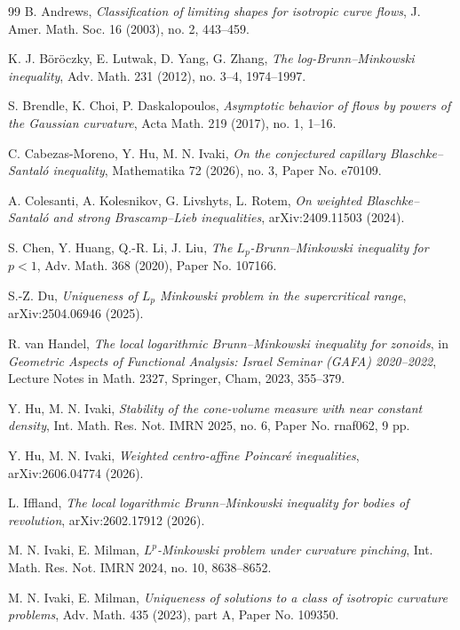 \documentclass[12pt]{amsart}
\theoremstyle{plain}
\theoremstyle{definition}
\theoremstyle{remark}
\numberwithin{equation}{section}
\begin{document}
\begin{thebibliography}{99}
 B. Andrews, \textit{Classification of limiting shapes for isotropic curve flows}, J. Amer. Math. Soc. 16 (2003), no. 2, 443--459.

 K. J. B\"or\"oczky, E. Lutwak, D. Yang, G. Zhang, \textit{The log-Brunn--Minkowski inequality}, Adv. Math. 231 (2012), no. 3--4, 1974--1997.

 S. Brendle, K. Choi, P. Daskalopoulos, \textit{Asymptotic behavior of flows by powers of the Gaussian curvature}, Acta Math. 219 (2017), no. 1, 1--16.

 C. Cabezas-Moreno, Y. Hu, M. N. Ivaki, \textit{On the conjectured capillary Blaschke--Santal\'o inequality}, Mathematika 72 (2026), no. 3, Paper No. e70109.

 A. Colesanti, A. Kolesnikov, G. Livshyts, L. Rotem, \textit{On weighted Blaschke--Santal\'o and strong Brascamp--Lieb inequalities}, arXiv:2409.11503 (2024).

 S. Chen, Y. Huang, Q.-R. Li, J. Liu, \textit{The $L_p$-Brunn--Minkowski inequality for $p<1$}, Adv. Math. 368 (2020), Paper No. 107166.

 S.-Z. Du, \textit{Uniqueness of $L_p$ Minkowski problem in the supercritical range}, arXiv:2504.06946 (2025).

 R. van Handel, \textit{The local logarithmic Brunn--Minkowski inequality for zonoids}, in \textit{Geometric Aspects of Functional Analysis: Israel Seminar (GAFA) 2020--2022}, Lecture Notes in Math. 2327, Springer, Cham, 2023, 355--379.

 Y. Hu, M. N. Ivaki, \textit{Stability of the cone-volume measure with near constant density}, Int. Math. Res. Not. IMRN 2025, no. 6, Paper No. rnaf062, 9 pp.

 Y. Hu, M. N. Ivaki, \textit{Weighted centro-affine Poincar\'e inequalities}, arXiv:2606.04774 (2026).

 L. Iffland, \textit{The local logarithmic Brunn--Minkowski inequality for bodies of revolution}, arXiv:2602.17912 (2026).

 M. N. Ivaki, E. Milman, \textit{$L^p$-Minkowski problem under curvature pinching}, Int. Math. Res. Not. IMRN 2024, no. 10, 8638--8652.

 M. N. Ivaki, E. Milman, \textit{Uniqueness of solutions to a class of isotropic curvature problems}, Adv. Math. 435 (2023), part A, Paper No. 109350.


\end{thebibliography}
\end{document}

